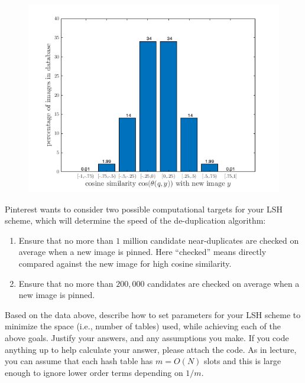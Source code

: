 \documentclass[10pt]{article}
\begin{document}
\begin{figure}[H]
	\centering
	\includegraphics[width=.6\textwidth]{dist.png}
\end{figure} 

Pinterest wants to consider two possible computational targets for your LSH scheme, which will determine the speed of the de-duplication algorithm:
\begin{enumerate}
	\item Ensure that no more than $1$ million candidate near-duplicates are checked on average when a new image is pinned. Here ``checked'' means directly compared against the new image for high cosine similarity.
	\item Ensure that no more than $200,000$ candidates are checked on average when a new image is pinned.
\end{enumerate}

\noindent Based on the data above, describe how to set parameters for your LSH scheme to minimize the space (i.e., number of tables) used, while achieving each of the above goals. Justify your answers, and any assumptions you make.
If you code anything up to help calculate your answer, please attach the code. As in lecture, you can assume that each hash table has $m = O(N)$ slots and this is large enough to ignore lower order terms depending on $1/m$. 
\end{document}
